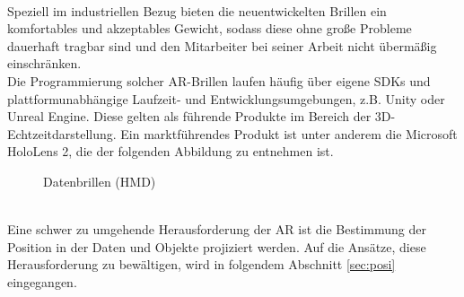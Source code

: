 \\ 
\linebreak 
Speziell im industriellen Bezug bieten die neuentwickelten Brillen ein komfortables und akzeptables Gewicht, sodass diese ohne große 
Probleme dauerhaft tragbar sind und den Mitarbeiter bei seiner Arbeit nicht übermäßig einschränken.
\\ 
\linebreak
Die Programmierung solcher \acs{AR}-Brillen laufen häufig über eigene \acs{SDK}s und plattformunabhängige Laufzeit- und 
Entwicklungsumgebungen, z.B. Unity oder Unreal Engine. Diese gelten als führende Produkte im Bereich der 3D-Echtzeitdarstellung.
Ein marktführendes Produkt ist unter anderem die Microsoft HoloLens 2, die der folgenden Abbildung zu entnehmen ist. 
\begin{figure}[hbt!]
    \centering
    \caption{Datenbrillen (\acs{HMD})}
    \label{pic:datenbrillen}
\end{figure}
\\ 
\linebreak
Eine schwer zu umgehende Herausforderung der \acl{AR} ist die Bestimmung der Position in der Daten und Objekte projiziert werden. Auf die 
Ansätze, diese Herausforderung zu bewältigen, wird in folgendem Abschnitt \ref{sec:posi} eingegangen.

